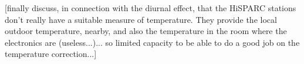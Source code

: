 %
%
%
%
%
%
%

[finally discuss, in connection with the diurnal effect, that the HiSPARC stations don't really have a suitable measure of temperature. They provide the local outdoor temperature, nearby, and also the temperature in the room where the electronics are (useless...)... so limited capacity to be able to do a good job on the temperature correction...]

